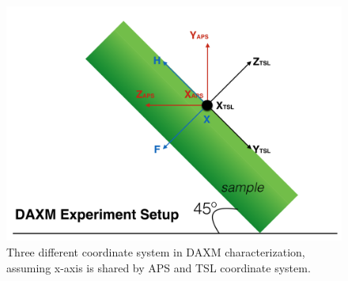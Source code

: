 \documentclass[12pt]{scrartcl}
\begin{document}
\begin{figure}[htp]
\centering
\includegraphics[width=.7\linewidth]{daxmcoord.png}
\caption{Three different coordinate system in DAXM characterization, assuming x-axis is shared by APS and TSL coordinate system.}
\label{fig:daxmcoord}
\end{figure}
\end{document}
